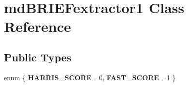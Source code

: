 \hypertarget{classmdBRIEFextractor1}{}\section{md\+B\+R\+I\+E\+Fextractor1 Class Reference}
\label{classmdBRIEFextractor1}
\subsection*{Public Types}
\begin{DoxyCompactItemize}
\item 
enum \{ {\bfseries H\+A\+R\+R\+I\+S\+\_\+\+S\+C\+O\+RE} =0, 
{\bfseries F\+A\+S\+T\+\_\+\+S\+C\+O\+RE} =1
 \}\hypertarget{classmdBRIEFextractor1_a65b82fbc66e46a5d5d2f59b9220a92f0}{}\label{classmdBRIEFextractor1_a65b82fbc66e46a5d5d2f59b9220a92f0}

\end{DoxyCompactItemize}
